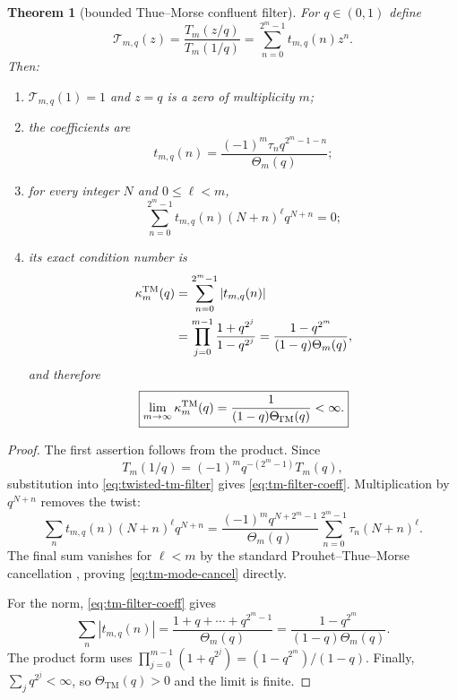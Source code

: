 \documentclass[11pt,oneside]{article}
\numberwithin{equation}{section}
\newtheorem{theorem}{Theorem}[section]
\theoremstyle{definition}
\theoremstyle{remark}
\newcommand{\ThetaTM}{\Theta_{\!\mathrm{TM}}}
\begin{document}
\begin{theorem}[bounded Thue--Morse confluent filter]
\label{thm:tm-filter}
For $q\in(0,1)$ define
\begin{equation}
 \mathcal T_{m,q}(z)
 =\frac{T_m(z/q)}{T_m(1/q)}
 =\sum_{n=0}^{2^m-1}t_{m,q}(n)z^n.
 \label{eq:twisted-tm-filter}
\end{equation}
Then:
\begin{enumerate}
\item $\mathcal T_{m,q}(1)=1$ and $z=q$ is a zero of multiplicity $m$;
\item the coefficients are
\begin{equation}
 t_{m,q}(n)
 =\frac{(-1)^m\tau_nq^{2^m-1-n}}{\Theta_m(q)};
 \label{eq:tm-filter-coeff}
\end{equation}
\item for every integer $N$ and $0\le\ell<m$,
\begin{equation}
 \sum_{n=0}^{2^m-1}t_{m,q}(n)(N+n)^\ell q^{N+n}=0;
 \label{eq:tm-mode-cancel}
\end{equation}
\item its exact condition number is
\begin{align}
 \kappa_m^{\rm TM}(q)
 &=\sum_{n=0}^{2^m-1}|t_{m,q}(n)| \\
 &=\prod_{j=0}^{m-1}\frac{1+q^{2^j}}{1-q^{2^j}}
 =\frac{1-q^{2^m}}{(1-q)\Theta_m(q)},
 \label{eq:tm-condition}
\end{align}
and therefore
\begin{equation}
 \boxed{\displaystyle
 \lim_{m\to\infty}\kappa_m^{\rm TM}(q)
 =\frac{1}{(1-q)\ThetaTM(q)}<\infty.}
 \label{eq:tm-condition-limit}
\end{equation}
\end{enumerate}
\end{theorem}

\begin{proof}
The first assertion follows from the product.  Since
\[
 T_m(1/q)=(-1)^mq^{-(2^m-1)}T_m(q),
\]
substitution into \eqref{eq:twisted-tm-filter} gives
\eqref{eq:tm-filter-coeff}.  Multiplication by $q^{N+n}$ removes the twist:
\[
 \sum_nt_{m,q}(n)(N+n)^\ell q^{N+n}
 =\frac{(-1)^mq^{N+2^m-1}}{\Theta_m(q)}
 \sum_{n=0}^{2^m-1}\tau_n(N+n)^\ell.
\]
The final sum vanishes for $\ell<m$ by the standard Prouhet--Thue--Morse
cancellation \cite{alloucheshallit}, proving \eqref{eq:tm-mode-cancel} directly.

For the norm, \eqref{eq:tm-filter-coeff} gives
\[
 \sum_n|t_{m,q}(n)|
 =\frac{1+q+\cdots+q^{2^m-1}}{\Theta_m(q)}
 =\frac{1-q^{2^m}}{(1-q)\Theta_m(q)}.
\]
The product form uses
$\prod_{j=0}^{m-1}(1+q^{2^j})=(1-q^{2^m})/(1-q)$.
Finally, $\sum_jq^{2^j}<\infty$, so $\ThetaTM(q)>0$ and the limit is finite.
\end{proof}
\end{document}
